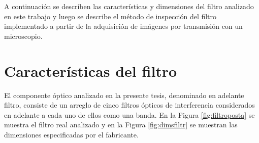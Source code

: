  A continuación se describen las características y dimensiones del filtro analizado en este trabajo y luego se describe el método de inspección del filtro implementado a partir de la adquisición de imágenes por transmisión con un microscopio.
 
\singlespacing
\section{Características del filtro}
\label{sec:carfilt}

\hspace{0.5cm}El componente óptico analizado en la presente tesis, denominado en adelante filtro, consiste de un arreglo de cinco filtros ópticos de interferencia  considerados en adelante a cada uno de ellos como una banda. En la Figura \ref{fig:filtroposta} se muestra el filtro real analizado y en la Figura \ref{fig:dimsfiltr} se muestran las dimensiones especificadas por el fabricante.
